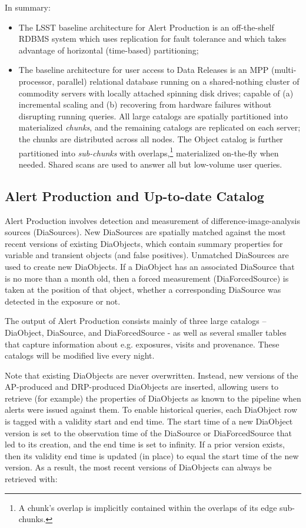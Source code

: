 \documentclass[DM,lsstdraft,toc]{lsstdoc}
\begin{document}
In summary:

\begin{itemize}
\item
  The LSST baseline architecture for Alert Production is an off-the-shelf
  RDBMS system which uses replication for fault tolerance and which takes
  advantage of horizontal (time-based) partitioning;
\item
  The baseline architecture for user access to Data Releases is an MPP
  (multi-processor, parallel) relational database running on a
  shared-nothing cluster of commodity servers with locally attached
  spinning disk drives; capable of (a) incremental scaling and (b)
  recovering from hardware failures without disrupting running queries.
  All large catalogs are spatially partitioned into materialized
  \emph{chunks}, and the remaining catalogs are replicated on each server;
  the chunks are distributed across all nodes. The Object catalog is
  further partitioned into \emph{sub-chunks} with overlaps,\footnote{A
  chunk's overlap is implicitly contained within the overlaps of its
  edge sub-chunks.} materialized on-the-fly when needed. Shared scans
  are used to answer all but low-volume user queries.
\end {itemize}

\subsection{Alert Production and Up-to-date Catalog}\label{alert-production-and-up-to-date-catalog}

Alert Production involves detection and measurement of difference-image-analysis
sources (DiaSources). New DiaSources are spatially matched against
the most recent versions of existing DiaObjects, which contain summary
properties for variable and transient objects (and false positives). Unmatched
DiaSources are used to create new DiaObjects. If a DiaObject has an associated
DiaSource that is no more than a month old, then a forced measurement
(DiaForcedSource) is taken at the position of that object, whether a
corresponding DiaSource was detected in the exposure or not.

The output of Alert Production consists mainly of three large catalogs --
DiaObject, DiaSource, and DiaForcedSource - as well as several smaller tables
that capture information about e.g. exposures, visits and provenance.
These catalogs will be modified live every night.

Note that existing DiaObjects are never overwritten. Instead, new versions of
the AP-produced and DRP-produced DiaObjects are inserted, allowing users to
retrieve (for example) the properties of DiaObjects as known to the pipeline
when alerts were issued against them. To enable historical queries, each
DiaObject row is tagged with a validity start and end time. The start time of
a new DiaObject version is set to the observation time of the DiaSource or
DiaForcedSource that led to its creation, and the end time is set to infinity.
If a prior version exists, then its validity end time is updated (in place) to
equal the start time of the new version. As a result, the most recent versions
of DiaObjects can always be retrieved with:
\end{document}
